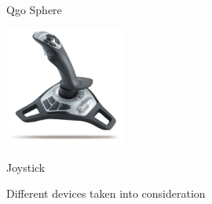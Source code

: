 \begin{figure}[h]
{\begin{center}
{			\begin{center}Qgo Sphere \end{center}}
			\hspace{0.05\textwidth}
			\parbox[b]{0.35\textwidth}{\includegraphics[width=0.35\textwidth]{Logitech-Freedom-Cordless-Joystick}
			\begin{center}Joystick \end{center}}
			\caption[Different devices taken into consideration]{Different devices taken into consideration}
			\label{figure:devices taken into consideration}	
		\end{center}
	}			
	\vspace{4.5mm}
\end{figure}


